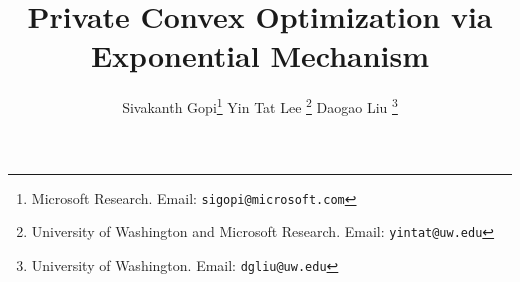 \documentclass[11pt]{article}
\title{Private Convex Optimization via Exponential Mechanism}
\author{
Sivakanth Gopi\thanks{Microsoft Research. Email: \texttt{sigopi@microsoft.com}}
\quad
Yin Tat Lee \thanks{University of Washington and Microsoft Research. Email: \texttt{yintat@uw.edu}}
\quad
Daogao Liu \thanks{University of Washington. Email: \texttt{dgliu@uw.edu}}
}
\date{}
\theoremstyle{plain}
\theoremstyle{definition}
\theoremstyle{remark}
\begin{document}
\begin{titlepage}
\maketitle
\begin{abstract}
    
\end{abstract}
  \thispagestyle{empty}
\end{titlepage}


{\hypersetup{linkcolor=black}
\tableofcontents
}
\newpage



%
%
% 











% 
% 
% 


%





% 
% 
% 
\end{document}
